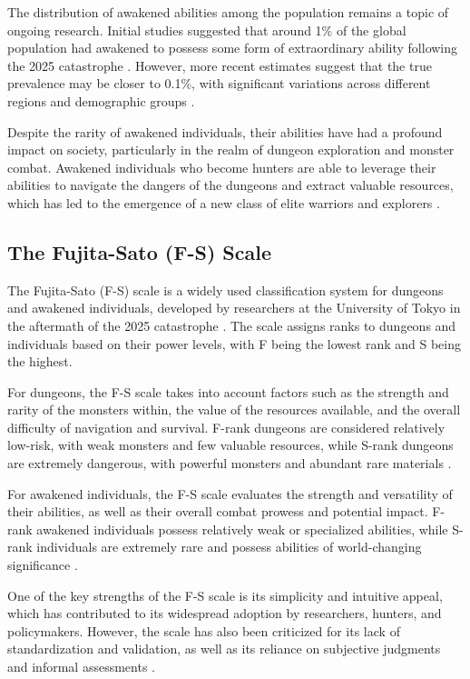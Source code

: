 \documentclass[12pt, a4paper]{article}
\begin{document}
The distribution of awakened abilities among the population remains a topic of ongoing research. Initial studies suggested that around 1\% of the global population had awakened to possess some form of extraordinary ability following the 2025 catastrophe \citep{Fujita2026}. However, more recent estimates suggest that the true prevalence may be closer to 0.1\%, with significant variations across different regions and demographic groups \citep{Choi2027}.

Despite the rarity of awakened individuals, their abilities have had a profound impact on society, particularly in the realm of dungeon exploration and monster combat. Awakened individuals who become hunters are able to leverage their abilities to navigate the dangers of the dungeons and extract valuable resources, which has led to the emergence of a new class of elite warriors and explorers \citep{Watanabe2027}.

\subsection{The Fujita-Sato (F-S) Scale}

The Fujita-Sato (F-S) scale is a widely used classification system for dungeons and awakened individuals, developed by researchers at the University of Tokyo in the aftermath of the 2025 catastrophe \citep{Fujita2026}. The scale assigns ranks to dungeons and individuals based on their power levels, with F being the lowest rank and S being the highest.

For dungeons, the F-S scale takes into account factors such as the strength and rarity of the monsters within, the value of the resources available, and the overall difficulty of navigation and survival. F-rank dungeons are considered relatively low-risk, with weak monsters and few valuable resources, while S-rank dungeons are extremely dangerous, with powerful monsters and abundant rare materials \citep{Nakamura2026}.

For awakened individuals, the F-S scale evaluates the strength and versatility of their abilities, as well as their overall combat prowess and potential impact. F-rank awakened individuals possess relatively weak or specialized abilities, while S-rank individuals are extremely rare and possess abilities of world-changing significance \citep{Sato2027}.

One of the key strengths of the F-S scale is its simplicity and intuitive appeal, which has contributed to its widespread adoption by researchers, hunters, and policymakers. However, the scale has also been criticized for its lack of standardization and validation, as well as its reliance on subjective judgments and informal assessments \citep{Kim2026}.
\end{document}
